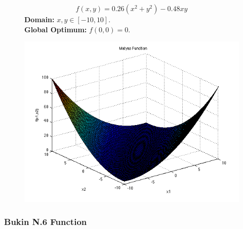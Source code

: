 \begin{figure}[H]
    \centering
    \begin{minipage}{0.65\textwidth}
        \begin{equation}
            f(x, y) = 0.26(x^2 + y^2) - 0.48xy
        \end{equation}
        \textbf{Domain:} \( x, y \in [-10, 10] \). \\
        \textbf{Global Optimum:} \( f(0,0) = 0 \).
    \end{minipage}
    \hfill
    \begin{minipage}{0.3\textwidth}
        \centering
        \includegraphics[width=\textwidth]{figures/matyas_function.png}
        \label{fig:matyas}
    \end{minipage}
\end{figure}

\subsubsection{Bukin N.6 Function}


